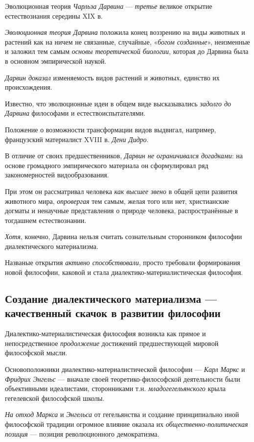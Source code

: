\documentclass[a4paper,14pt,russian]{extreport}
\begin{document}
Эволюционная теория \emph{Чарльза Дарвина} --- \emph{третье} великое открытие естествознания середины XIX в.

\emph{Эволюционная теория Дарвина} положила конец воззрению на виды животных и растений как на ничем не связанные, случайные, «\emph{богом созданные}», неизменные и заложил тем самым \emph{основы теоретической биологии}, которая до Дарвина была в основном эмпирической наукой.

\emph{Дарвин доказал} изменяемость видов растений и животных, единство их происхождения.

Известно, что эволюционные идеи в общем виде высказывались \emph{задолго до Дарвина} философами и естествоиспытателями.

Положение о возможности трансформации видов выдвигал, например, французский материалист XVIII в. \emph{Дени Дидро}.

В отличие от своих предшественников, \emph{Дарвин не ограничивался догадками}: на основе громадного эмпирического материала он сформулировал ряд закономерностей видообразования.

При этом он рассматривал человека \emph{как высшее звено} в общей цепи развития животного мира, \emph{опровергая} тем самым, желая того или нет, христианские догматы и ненаучные представления о природе человека, распространённые в тогдашнем естествознании.

\emph{Хотя}, конечно, Дарвина нельзя считать сознательным сторонником философии диалектического материализма.

Названые открытия \emph{активно способствовали}, просто требовали формирования новой философии, каковой и стала диалектико-материалистическая философия.

\subsection{Создание диалектического материализма --- качественный скачок в развитии философии}

Диалектико-материалистическая философия возникла как прямое и непосредственное \emph{продолжение} достижений предшествующей мировой философской мысли.

Основоположники диалектико-материалистической философии --- \emph{Карл Маркс} и \emph{Фридрих Энгельс} --- вначале своей теоретико-философской деятельности были объективными идеалистами, сторонниками т.н. \emph{младогегельянского} крыла гегелевской философской школы.

\emph{На отход Маркса} и \emph{Энгельса} от гегельянства и создание принципиально иной философской традиции огромное влияние оказала их \emph{общественно-политическая позиция} --- позиция революционного демократизма.
\end{document}

